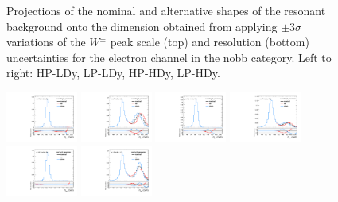 \begin{figure}[htbp]
  \caption{
    Projections of the nominal and alternative shapes of the resonant background onto the \MJ dimension obtained from applying $\pm3\sigma$ variations of the $W^\pm$ peak scale (top) and resolution (bottom) uncertainties for the electron channel in the nobb category.
    Left to right: HP-LDy, LP-LDy, HP-HDy, LP-HDy.
  }
  \label{fig:systResMJ_scaleWY_resWY}
\end{figure}

\begin{figure}[htbp]
  \centering
  \includegraphics[width=0.21\textwidth]{fig/uncertainties/systs_res_e_HP_nobb_LDy_scaleTopY_ProjY.pdf}
  \includegraphics[width=0.21\textwidth]{fig/uncertainties/systs_res_e_LP_nobb_LDy_scaleTopY_ProjY.pdf}
  \includegraphics[width=0.21\textwidth]{fig/uncertainties/systs_res_e_HP_nobb_HDy_scaleTopY_ProjY.pdf}
  \includegraphics[width=0.21\textwidth]{fig/uncertainties/systs_res_e_LP_nobb_HDy_scaleTopY_ProjY.pdf}\\
  \includegraphics[width=0.21\textwidth]{fig/uncertainties/systs_res_e_HP_nobb_LDy_resTopY_ProjY.pdf}
  \includegraphics[width=0.21\textwidth]{fig/uncertainties/systs_res_e_LP_nobb_LDy_resTopY_ProjY.pdf}

\end{figure}
